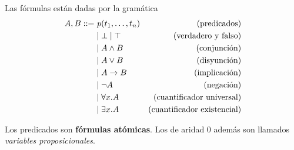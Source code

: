 \begin{definition}[Fórmulas]
    Las fórmulas están dadas por la gramática
    \begin{align*}
        A, B ::=
         & \ p(t_1, \dots, t_n) & (\text{predicados})                \\
         & \mid \bot \mid \top             & \text{(verdadero y falso)}         \\
         & \mid A \wedge B        & \text{(conjunción)}                \\
         & \mid A \vee B         & \text{(disyunción)}                \\
         & \mid A \to B        & \text{(implicación)}               \\
         & \mid \neg A                 & \text{(negación)}                  \\
         & \mid \forall x . A        & \text{(cuantificador universal)}   \\
         & \mid \exists x . A        & \text{(cuantificador existencial)}
    \end{align*}

    Los predicados son \textbf{fórmulas atómicas}. Los de aridad 0 además son llamados \textit{variables proposicionales}.
\end{definition}

